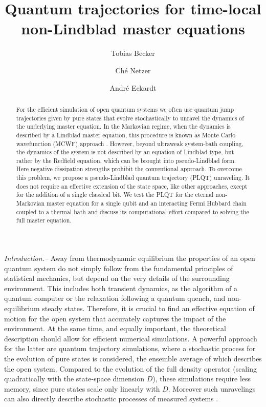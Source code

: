\documentclass[twocolumn,prl,superscriptaddress]{revtex4-2}
\title@column\titleblock@produce
\makeatletter
\def\maketitle{
	\@author@finish
	\title@column\titleblock@produce
	\suppressfloats[t]}
\makeatother
\begin{document}
\title{Quantum trajectories for time-local non-Lindblad master equations}
\author{Tobias Becker}
\author{Ch\'{e} Netzer}
\author{Andr\'{e} Eckardt}



\begin{abstract}
For the efficient simulation of open quantum systems we often use quantum jump trajectories given by pure states that evolve stochastically to unravel the dynamics of the underlying master equation. In the Markovian regime, when the dynamics is described by a Lindblad master equation, this procedure is known as Monte Carlo wavefunction (MCWF) approach  \cite{Dalibard92,GardinerZoller1992:1}. However, beyond ultraweak system-bath coupling, the dynamics of the system is not described by an equation of Lindblad type, but rather by the Redfield equation, which can be brought into pseudo-Lindblad form. Here negative dissipation strengths prohibit the conventional approach. To overcome this problem, we propose a pseudo-Lindblad quantum trajectory (PLQT) unraveling. It does not require an effective extension of the state space, like other approaches, except for the addition of a single classical bit. We test the PLQT for the eternal non-Markovian master equation for a single qubit and an interacting Fermi Hubbard chain coupled to a thermal bath and discuss its computational effort compared to solving the full master equation.
\end{abstract}

\maketitle
\emph{Introduction.--} Away from thermodynamic equilibrium the properties of an open quantum system do not simply follow from the fundamental principles of statistical mechanics, but depend on the very details of the surrounding environment. 
This includes both transient dynamics, as the algorithm of a quantum computer or the relaxation following a quantum quench, and non-equilibrium steady states. Therefore, it is crucial to find an effective equation of motion for the open system that accurately captures the impact of the environment. At the same time, and equally important, the theoretical description should allow for efficient numerical simulations. A powerful approach for the latter are quantum trajectory simulations, where a stochastic process for the evolution of pure states is considered, the ensemble average of which describes the open system. Compared to the evolution of the full density operator (scaling quadratically with the state-space dimension $D$), these simulations require less memory, since pure states scale only linearly with $D$. Moreover such unravelings can also directly describe stochastic processes of measured systems \cite{THBasche1995,SGleyzes2007,ZKMinev2019}. 
\end{document}
